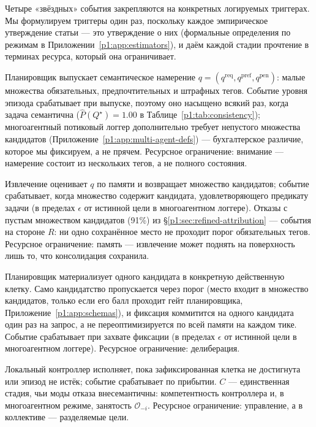\documentclass{article}
\begin{document}
Четыре «звёздных» события закрепляются на конкретных логируемых триггерах. Мы формулируем триггеры один раз, поскольку каждое эмпирическое утверждение статьи --- это утверждение о них (формальные определения по режимам в Приложении~\ref{p1:app:estimators}), и даём каждой стадии прочтение в терминах ресурса, который она ограничивает.

\begin{description}[leftmargin=10pt,topsep=2pt,itemsep=2pt]
\item[$Q^\star$ (намерение выпущено).] Планировщик выпускает семантическое намерение $q=(q^{\mathrm{req}},q^{\mathrm{pref}},q^{\mathrm{pen}})$: малые множества обязательных, предпочтительных и штрафных тегов. Событие уровня эпизода срабатывает при выпуске, поэтому оно насыщено всякий раз, когда задача семантична ($\hat P(Q^\star){=}1.00$ в Таблице~\ref{p1:tab:consistency}); многоагентный потиковый логгер дополнительно требует непустого множества кандидатов (Приложение~\ref{p1:app:multi-agent-defs}) --- бухгалтерское различие, которое мы фиксируем, а не прячем. Ресурсное ограничение: внимание --- намерение состоит из нескольких тегов, а не полного состояния.
\item[$R^\star$ (память отвечает).] Извлечение оценивает $q$ по памяти и возвращает множество кандидатов; событие срабатывает, когда множество содержит кандидата, удовлетворяющего предикату задачи (в пределах $\epsilon$ от истинной цели в многоагентном логгере). Отказы с пустым множеством кандидатов (91\%) из \S\ref{p1:sec:refined-attribution} --- события на стороне $R$: ни одно сохранённое место не проходит порог обязательных тегов. Ресурсное ограничение: память --- извлечение может поднять на поверхность лишь то, что консолидация сохранила.
\item[$M^\star$ (фиксация цели).] Планировщик материализует одного кандидата в конкретную действенную клетку. Само кандидатство пропускается через порог (место входит в множество кандидатов, только если его балл проходит гейт планировщика, Приложение~\ref{p1:app:schemas}), и фиксация коммитится на одного кандидата один раз на запрос, а не переоптимизируется по всей памяти на каждом тике. Событие срабатывает при захвате фиксации (в пределах $\epsilon$ от истинной цели в многоагентном логгере). Ресурсное ограничение: делиберация.
\item[$C^\star$ (замкнутое завершение).] Локальный контроллер исполняет, пока зафиксированная клетка не достигнута или эпизод не истёк; событие срабатывает по прибытии. $C$ --- единственная стадия, чьи моды отказа внесемантичны: компетентность контроллера и, в многоагентном режиме, занятость $\mathcal{O}_{-i}$. Ресурсное ограничение: управление, а в коллективе --- разделяемые цели.
\end{description}
\end{document}
